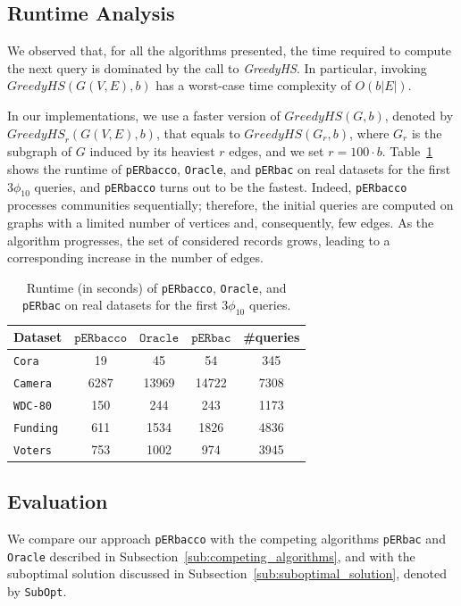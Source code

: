 \documentclass[sigconf, nonacm]{acmart}
\newcommand{\window}{b}
\newcommand{\DD}{\texttt{Oracle}\xspace}
\newcommand{\subopt}{\texttt{SubOpt}\xspace}
\newcommand{\perbacco}{\texttt{pERbacco}\xspace}
\newcommand{\perbac}{\texttt{pERbac}\xspace}
\newcommand{\cora}{\texttt{Cora}\xspace}
\newcommand{\camera}{\texttt{Camera}\xspace}
\newcommand{\funding}{\texttt{Funding}\xspace}
\newcommand{\voters}{\texttt{Voters}\xspace}
\newcommand{\wdc}{\texttt{WDC-80}\xspace}
\begin{document}
\subsection{Runtime Analysis}\label{sub:runtime_analysis}


We observed that, for all the algorithms presented, the time required to compute the next query is dominated by the call to \textit{GreedyHS}. In particular, invoking $\textit{GreedyHS}(G(V,E),b)$ has a worst-case time complexity of $O(b|E|)$.

In our implementations, we use a faster version of $\textit{GreedyHS}(G,b)$, denoted by $\textit{GreedyHS}_r(G(V,E),b)$, that equals to $\textit{GreedyHS}(G_r,b)$, where $G_r$ is the subgraph of $G$ induced by its heaviest $r$ edges, and we set $r= 100\cdot\window$. 
Table~\ref{tab:runtime} shows the runtime of \perbacco, \DD, and \perbac on real datasets for the first $3\phi_{10}$ queries, and \perbacco turns out to be the fastest.
Indeed, \perbacco processes communities sequentially; therefore, the initial queries are computed on graphs with a limited number of vertices and, consequently, few edges. 
As the algorithm progresses, the set of considered records grows, leading to a corresponding increase in the number of edges.




{\small
\begin{table}[h!]
\setlength{\tabcolsep}{2pt}
\centering
\begin{tabular}{l c c c c }
\hline
Dataset & $\perbacco$ & $\DD$ & $\perbac$ & \#queries\\
\hline
\cora    & 19   & 45  & 54    &  345 \\
\camera  & 6287 & 13969 & 14722 &  7308 \\
\wdc   & 150  & 244   & 243   &  1173  \\
\funding & 611  & 1534  & 1826  &  4836  \\
\voters  & 753  & 1002  & 974   &  3945   \\
\hline
\end{tabular}
\caption{Runtime (in seconds) of \perbacco, \DD, and \perbac on real datasets for the first $3\phi_{10}$ queries.}
\label{tab:runtime}
\end{table}
}

\subsection{Evaluation}

We compare our approach \perbacco with the competing algorithms  \perbac and \DD described in Subsection~\ref{sub:competing_algorithms}, and with the suboptimal solution discussed in Subsection~\ref{sub:suboptimal_solution}, denoted by \subopt.
\end{document}
